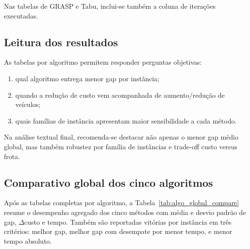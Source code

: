 Nas tabelas de GRASP e Tabu, inclui-se também a coluna de iterações executadas.


\subsection{Leitura dos resultados}

As tabelas por algoritmo permitem responder perguntas objetivas:
\begin{enumerate}
  \item qual algoritmo entrega menor gap por instância;
  \item quando a redução de custo vem acompanhada de aumento/redução de veículos;
  \item quais famílias de instância apresentam maior sensibilidade a cada método.
\end{enumerate}

Na análise textual final, recomenda-se destacar não apenas o menor gap médio global, mas também robustez por família de instâncias e trade-off custo versus frota.

\subsection{Comparativo global dos cinco algoritmos}
\label{subsec:comparativo_global}

Após as tabelas completas por algoritmo, a Tabela~\ref{tab:algo_global_compare} resume o desempenho agregado dos cinco métodos com média e desvio padrão de gap, $\Delta$custo e tempo.
Também são reportadas vitórias por instância em três critérios: melhor gap, melhor gap com desempate por menor tempo, e menor tempo absoluto.


